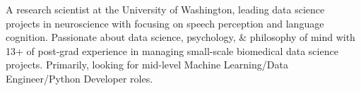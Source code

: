 

\begin{cvparagraph}

 A research scientist at the University of Washington, leading data science projects in neuroscience with focusing on speech perception and language cognition. Passionate about data science, psychology, \& philosophy of mind with 13+ of post-grad experience in managing small-scale biomedical data science projects. Primarily, looking for mid-level Machine Learning/Data Engineer/Python Developer roles.
\end{cvparagraph}
